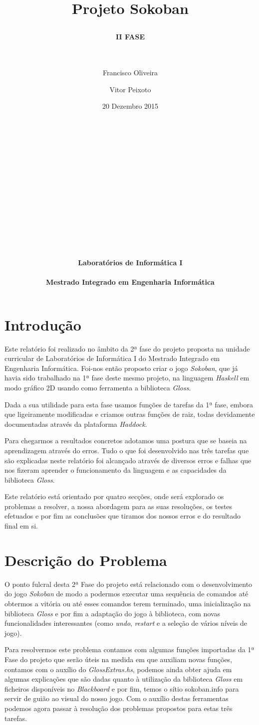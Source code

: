 \documentclass[a4paper,12pt]{report}
\title{\bf Projeto Sokoban \paragraph*{II FASE} }
\author{Francisco Oliveira \and Vitor Peixoto}
\date{20 Dezembro 2015 \\ \\ \\ \\ \\ \\ \\ \\ \\ \\ \\ \\ \\ \\ \\ \\  {\bf Laboratórios de Informática I \\ \\ Mestrado Integrado em Engenharia Informática}}
\begin{document}
\maketitle
\tableofcontents


\chapter{Introdução}

Este relatório foi realizado no âmbito da 2ª fase do projeto proposta na unidade curricular de Laboratórios de Informática I do Mestrado Integrado em Engenharia Informática. Foi-nos então proposto criar o jogo {\sl Sokoban}, que já havia sido trabalhado na 1ª fase deste mesmo projeto, na linguagem {\sl Haskell} em modo gráfico 2D usando como ferramenta a biblioteca {\sl Gloss}. 

Dada a sua utilidade para esta fase usamos funções de tarefas da 1ª fase, embora que ligeiramente modificadas e criamos outras funções de raiz, todas devidamente documentadas através da plataforma {\sl Haddock}.

Para chegarmos a resultados concretos adotamos uma postura que se baseia na aprendizagem através do erros. Tudo o que foi desenvolvido nas três tarefas que são explicadas neste relatório foi alcançado através de diversos erros e falhas que nos fizeram aprender o funcionamento da linguagem e as capacidades da biblioteca {\sl Gloss}.

Este relatório está orientado por quatro secções, onde será explorado os problemas a resolver, a nossa abordagem para as suas resoluções, os testes efetuados e por fim as conclusões que tiramos dos nossos erros e do resultado final em si.





\chapter{Descrição do Problema}

O ponto fulcral desta 2ª Fase do projeto está relacionado com o desenvolvimento do jogo {\sl Sokoban} de modo a podermos executar uma sequência de comandos até obtermos a vitória ou até esses comandos terem terminado, uma inicialização na biblioteca {\sl Gloss} e por fim a adaptação do jogo à biblioteca, com novas funcionalidades interessantes (como {\sl undo}, {\sl restart} e a seleção de vários níveis de jogo).

Para resolvermos este problema contamos com algumas funções importadas da 1ª Fase do projeto que serão úteis na medida em que auxiliam novas funções, contamos com o auxílio do {\it GlossExtras.hs}, podemos ainda obter ajuda em algumas explicações que são dadas quanto à utilização da biblioteca {\sl Gloss} em ficheiros disponíveis no {\sl Blackboard} e por fim, temos o sítio {\sf sokoban.info} para servir de guião ao visual do nosso jogo. Com o auxílio destas ferramentas podemos agora passar à resolução dos problemas propostos para estas três tarefas.
\end{document}
